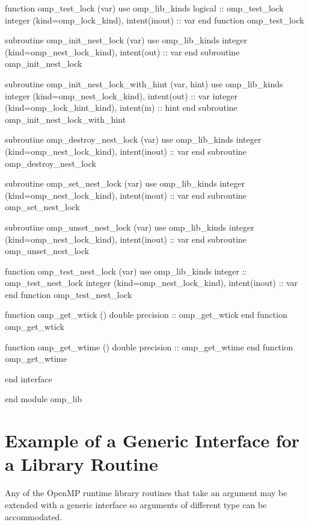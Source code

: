 {\begin{codepar}
          function omp\_test\_lock (var)
           use omp\_lib\_kinds
           logical :: omp\_test\_lock
           integer (kind=omp\_lock\_kind), intent(inout) :: var
          end function omp\_test\_lock

          subroutine omp\_init\_nest\_lock (var)
           use omp\_lib\_kinds
           integer (kind=omp\_nest\_lock\_kind), intent(out) :: var
          end subroutine omp\_init\_nest\_lock

          subroutine omp\_init\_nest\_lock\_with\_hint (var, hint)
           use omp\_lib\_kinds
           integer (kind=omp\_nest\_lock\_kind), intent(out) :: var
           integer (kind=omp\_lock\_hint\_kind), intent(in) :: hint
          end subroutine omp\_init\_nest\_lock\_with\_hint

          subroutine omp\_destroy\_nest\_lock (var)
           use omp\_lib\_kinds
           integer (kind=omp\_nest\_lock\_kind), intent(inout) :: var
          end subroutine omp\_destroy\_nest\_lock

          subroutine omp\_set\_nest\_lock (var)
           use omp\_lib\_kinds
           integer (kind=omp\_nest\_lock\_kind), intent(inout) :: var
          end subroutine omp\_set\_nest\_lock

          subroutine omp\_unset\_nest\_lock (var)
           use omp\_lib\_kinds
           integer (kind=omp\_nest\_lock\_kind), intent(inout) :: var
          end subroutine omp\_unset\_nest\_lock

          function omp\_test\_nest\_lock (var)
           use omp\_lib\_kinds
           integer :: omp\_test\_nest\_lock
           integer (kind=omp\_nest\_lock\_kind), intent(inout) :: var
          end function omp\_test\_nest\_lock

          function omp\_get\_wtick ()
           double precision :: omp\_get\_wtick
          end function omp\_get\_wtick

          function omp\_get\_wtime ()
           double precision :: omp\_get\_wtime
          end function omp\_get\_wtime

          end interface

        end module omp\_lib
\end{codepar}} %






\pagebreak
\section{Example of a Generic Interface for a Library Routine}
\label{sec:Example of a Generic Interface for a Library Routine}
Any of the OpenMP runtime library routines that take an argument may be extended 
with a generic interface so arguments of different  type can be accommodated.

